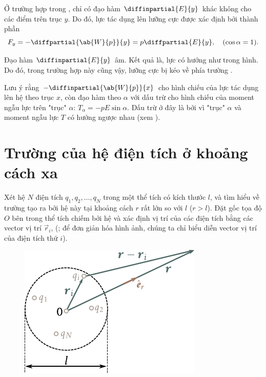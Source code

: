 Ở trường hợp trong , chỉ có đạo hàm $\diffinpartial{E}{y}$ khác không cho các điểm trên trục $y$. Do đó, lực tác dụng lên lưỡng cực được xác định bởi thành phần
\begin{equation*}
	F_y = -\diffpartial{\ab{W}{p}}{y} = p \diffpartial{E}{y},\quad (\cos\alpha=1).
\end{equation*}

\noindent
Đạo hàm $\diffinpartial{E}{y}$ âm. Kết quả là, lực có hướng như trong hình. Do đó, trong trường hợp này cũng vậy, lưỡng cực bị kéo về phía trường   .

Lưu ý rằng $-\diffinpartial{\ab{W}{p}}{x}$ cho hình chiếu của lực tác dụng lên hệ theo trục $x$, còn đạo hàm  theo $\alpha$ với dấu trừ cho hình chiếu của moment ngẫu lực trên "trục" $\alpha$: $T_{\alpha}=-pE\sin\alpha$. Dấu trừ ở đây là bởi vì "trục" $\alpha$ và moment ngẫu lực $T$ có hướng ngược nhau (xem ).

\section{Trường của hệ điện tích ở khoảng cách xa}\label{sec:1_10}

Xét hệ $N$ điện tích $q_1, q_2, \ldots, q_N$ trong một thể tích có kích thước $l$, và tìm hiểu về trường tạo ra bởi hệ này tại khoảng cách $r$ rất lớn so với $l$ ($r>l$). Đặt gốc tọa độ $O$ bên trong thể tích chiếm bởi hệ và xác định vị trí của các điện tích bằng các vector vị trí $\vec{r}_i$, (; để đơn giản hóa hình ảnh, chúng ta chỉ biểu diễn vector vị trí của điện tích thứ $i$).

\begin{figure}[!htb]
	\begin{center}
		\includegraphics[scale=0.95]{figures/ch_01/fig_1_16.pdf}
		\caption[]{}
		\label{fig:1_16}
	\end{center}
	\vspace{-1.0cm}
\end{figure}

